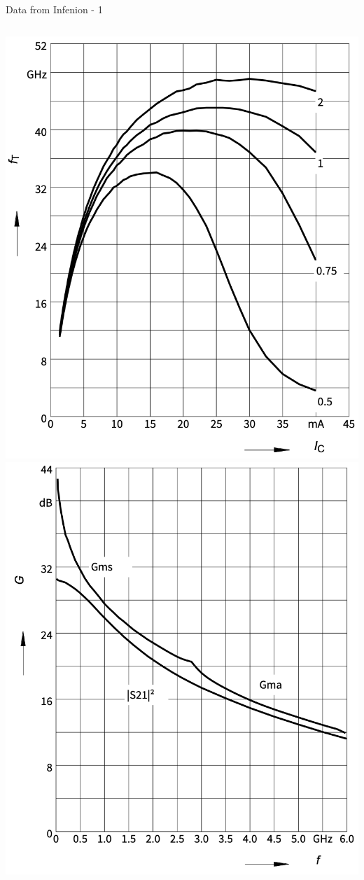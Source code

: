 \documentclass{beamer}
\begin{document}
\begin{frame}{Data from Infenion - 1}
  \begin{columns}
    \includegraphics[width=\linewidth]{images/transition_freq_vs_f.png}
    \includegraphics[width=\linewidth]{images/gain_vs_f.png}
  \end{columns}
  \end{frame}
  
\end{document}
